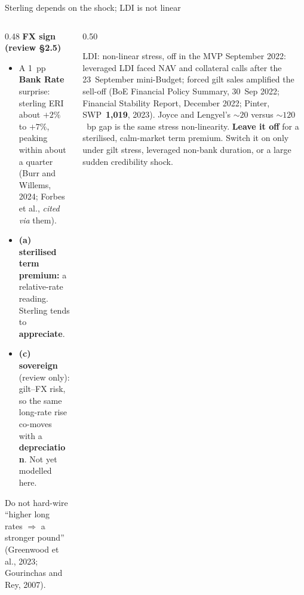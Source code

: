 \documentclass[11pt,aspectratio=169]{beamer}
\begin{document}
\begin{frame}{Sterling depends on the shock; LDI is not linear}
  \begin{columns}[T]
    \begin{column}{0.48\textwidth}
      \textbf{FX sign (review \S2.5)}
      \begin{itemize}
        \item A 1~pp \textbf{Bank Rate} surprise:
              sterling ERI about $+2\%$ to $+7\%$,
              peaking within about a quarter
              (Burr and Willems, 2024; Forbes et al.,
              \emph{cited via} them).
        \item \textbf{(a) sterilised term premium:}
              a relative-rate reading.
              Sterling tends to \textbf{appreciate}.
        \item \textbf{(c) sovereign} (review only):
              gilt--FX risk, so the same long-rate
              rise co-moves with a
              \textbf{depreciation}.
              Not yet modelled here.
      \end{itemize}
      {\scriptsize Do not hard-wire ``higher long rates
      $\Rightarrow$ a stronger pound''
      (Greenwood et al., 2023;
      Gourinchas and Rey, 2007).}
    \end{column}
    \begin{column}{0.50\textwidth}
      \begin{alertblock}{LDI: non-linear stress, off in the MVP}
        {\scriptsize
        September 2022: leveraged LDI faced NAV and collateral
        calls after the 23~September mini-Budget; forced gilt sales
        amplified the sell-off
        (BoE Financial Policy Summary, 30~Sep 2022;
        Financial Stability Report, December 2022;
        Pinter, SWP~\textbf{1,019}, 2023).
        Joyce and Lengyel's $\sim 20$ versus $\sim 120$~bp gap is
        the same stress non-linearity.
        \textbf{Leave it off} for a sterilised, calm-market term
        premium. Switch it on only under gilt stress, leveraged
        non-bank duration, or a large sudden credibility shock.}
      \end{alertblock}
    \end{column}
  \end{columns}
\end{frame}

\end{document}
